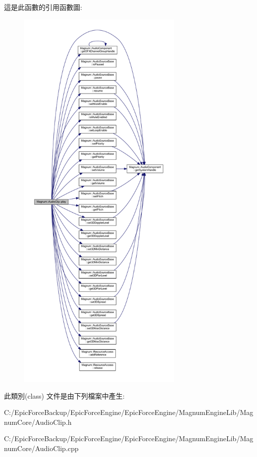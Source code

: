 這是此函數的引用函數圖\+:\nopagebreak
\begin{figure}[H]
\begin{center}
\leavevmode
\includegraphics[height=550pt]{class_magnum_1_1_audio_clip_a321057b7eee920588da25754380af705_cgraph}
\end{center}
\end{figure}




此類別(class) 文件是由下列檔案中產生\+:\begin{DoxyCompactItemize}
\item 
C\+:/\+Epic\+Force\+Backup/\+Epic\+Force\+Engine/\+Epic\+Force\+Engine/\+Magnum\+Engine\+Lib/\+Magnum\+Core/Audio\+Clip.\+h\item 
C\+:/\+Epic\+Force\+Backup/\+Epic\+Force\+Engine/\+Epic\+Force\+Engine/\+Magnum\+Engine\+Lib/\+Magnum\+Core/Audio\+Clip.\+cpp\end{DoxyCompactItemize}
